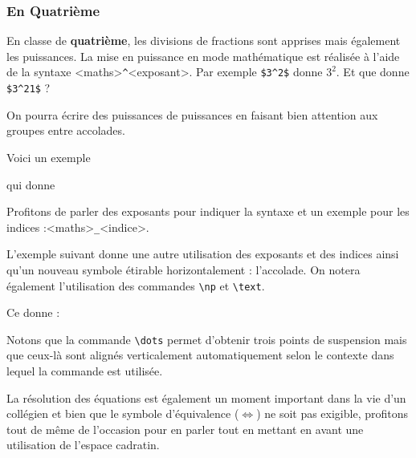 \subsubsection{En Quatrième}

En classe de \textbf{quatrième}, les divisions de fractions sont apprises mais également les puissances. La mise en puissance en mode mathématique est réalisée à l'aide de la syntaxe <maths>\verb+^+<exposant>. Par exemple \verb!$3^2$! donne $3^2$. Et que donne \verb!$3^21$! ?

\begin{info}
    On pourra écrire des puissances de puissances en faisant bien attention aux groupes entre accolades.
\end{info}

Voici un exemple


qui donne 



Profitons de parler des exposants pour indiquer la syntaxe et un exemple pour les indices :\linebreak <maths>\verb!_!<indice>.

L'exemple suivant donne une autre utilisation des exposants et des indices ainsi qu'un nouveau symbole étirable horizontalement : l'accolade. On notera également l'utilisation des commandes \texttt{\textbackslash np} et \texttt{\textbackslash text}.


Ce  donne :



\begin{info}
    Notons que la commande \texttt{\textbackslash dots} permet d'obtenir trois points de suspension mais que ceux-là sont alignés verticalement automatiquement selon le contexte dans lequel la commande est utilisée.
\end{info}

La résolution des équations est également un moment important dans la vie d'un collégien et bien que le symbole d'équivalence ($\Leftrightarrow$) ne soit pas exigible, profitons tout de même de l'occasion pour en parler tout en mettant en avant une utilisation de l'espace cadratin.


